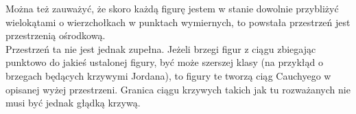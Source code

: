 \documentclass[a4paper, 12pt]{article}
\begin{document}
Można też zauważyć, że skoro każdą figurę jestem w stanie dowolnie przybliżyć wielokątami o wierzchołkach
w punktach wymiernych, to powstała przestrzeń jest przestrzenią ośrodkową.
\\
Przestrzeń ta nie jest jednak zupełna. Jeżeli brzegi figur z ciągu zbiegając punktowo do jakieś ustalonej
figury, być może szerszej klasy (na przykłąd o brzegach będących krzywymi Jordana), to figury te
tworzą ciąg Cauchyego w opisanej wyżej przestrzeni. Granica ciągu krzywych takich jak tu rozważanych nie musi
 być jednak głądką krzywą.
%
%
%
\end{document}

